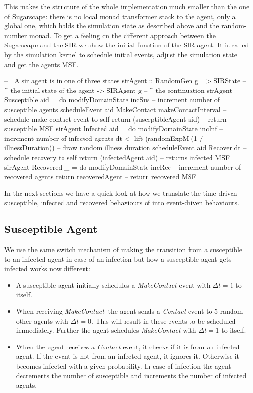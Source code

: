 This makes the structure of the whole implementation much smaller than the one of Sugarscape: there is no local monad transformer stack to the agent, only a global one, which holds the simulation state as described above and the random-number monad. To get a feeling on the different approach between the Sugarscape and the SIR we show the initial function of the SIR agent. It is called by the simulation kernel to schedule initial events, adjust the simulation state and get the agents MSF.

\begin{HaskellCode}
-- | A sir agent is in one of three states
sirAgent :: RandomGen g 
         => SIRState    -- ^ the initial state of the agent
         -> SIRAgent g  -- ^ the continuation
sirAgent Susceptible aid = do
    modifyDomainState incSus -- increment number of susceptible agents
    scheduleEvent aid MakeContact makeContactInterval -- schedule make contact event to self
    return (susceptibleAgent aid) -- return susceptible MSF
sirAgent Infected aid = do
    modifyDomainState incInf -- increment number of infected agents
    dt <- lift (randomExpM (1 / illnessDuration)) -- draw random illness duration
    scheduleEvent aid Recover dt -- schedule recovery to self
    return (infectedAgent aid) -- returns infected MSF 
sirAgent Recovered _ = do
    modifyDomainState incRec -- increment number of recovered agents
    return recoveredAgent -- return recovered MSF
\end{HaskellCode}

In the next sections we have a quick look at how we translate the time-driven susceptible, infected and recovered behaviours of into event-driven behaviours.

\subsection{Susceptible Agent}
We use the same switch mechanism of making the transition from a susceptible to an infected agent in case of an infection but how a susceptible agent gets infected works now different:

\begin{itemize}
	\item A susceptible agent initially schedules a \textit{MakeContact} event with $\Delta t = 1$ to itself.
	\item When receiving \textit{MakeContact}, the agent sends a \textit{Contact} event to 5 random other agents with $\Delta t = 0$. This will result in these events to be scheduled immediately. Further the agent schedules \textit{MakeContact} with $\Delta t = 1$ to itself.
	\item When the agent receives a \textit{Contact} event, it checks if it is from an infected agent. If the event is not from an infected agent, it ignores it. Otherwise it becomes infected with a given probability. In case of infection the agent decrements the number of susceptible and increments the number of infected agents.
\end{itemize}

